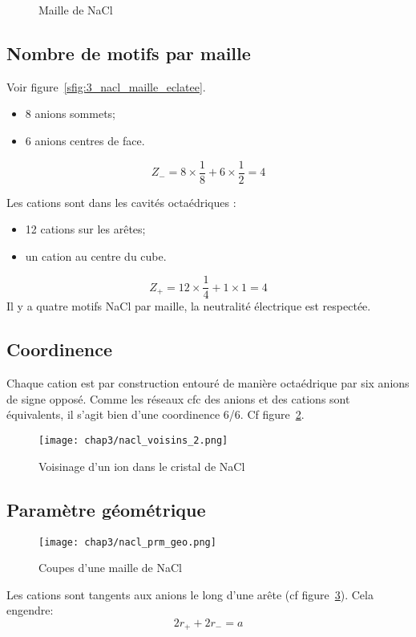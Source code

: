 \begin{figure}
    \centering
    \qquad
    \caption{Maille de NaCl}\label{fig:3_nacl_struct}
\end{figure}


\subsection{Nombre de motifs par maille}
Voir figure~\ref{sfig:3_nacl_maille_eclatee}.
\begin{itemize}
    \item 8 anions sommets;
    \item 6 anions centres de face.
\end{itemize}
\begin{equation}
    Z_- = 8 \times \frac{1}{8} + 6 \times \frac{1}{2} = 4
\end{equation}


Les cations sont dans les cavités octaédriques :
\begin{itemize}
    \item 12 cations sur les arêtes;
    \item un cation au centre du cube.
\end{itemize}
\begin{equation}
    Z_+ = 12 \times \frac{1}{4} + 1 \times 1 = 4
\end{equation}
Il y a quatre motifs NaCl par maille, la neutralité
électrique est respectée.


\subsection{Coordinence}
Chaque cation est par construction entouré de manière octaédrique par six anions
de signe opposé. Comme les réseaux cfc des anions et des cations sont équivalents, il
s'agit bien d’une coordinence 6/6. Cf figure~\ref{fig:3_nacl_voisins}.
\begin{figure}
    \centering
    \texttt{[image: chap3/nacl\_voisins\_2.png]}
    \caption{Voisinage d'un ion dans le cristal de NaCl}
    \label{fig:3_nacl_voisins}
\end{figure}


\subsection{Paramètre géométrique}
\begin{figure}
    \centering
    \texttt{[image: chap3/nacl\_prm\_geo.png]}
    \caption{Coupes d'une maille de NaCl}\label{fig:3_nacl_maille_coupe}
\end{figure}
Les cations sont tangents aux anions le long d'une arête (cf figure~\ref{fig:3_nacl_maille_coupe}).
Cela engendre:
\begin{equation}
    2r_+ + 2r_- = a
    \label{eq:3_nacl_ar}
\end{equation}


